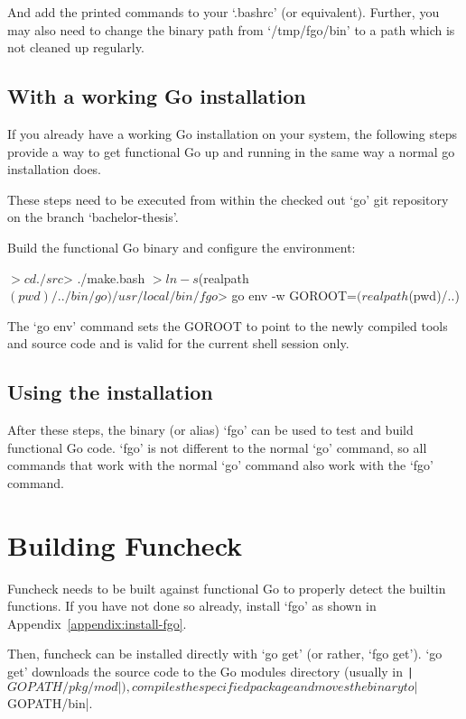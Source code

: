 And add the printed commands to your `.bashrc' (or equivalent). Further, you may
also need to change the binary path from `/tmp/fgo/bin' to a path which is not
cleaned up regularly.

\subsection{With a working Go installation}

If you already have a working Go installation on your system, the following
steps provide a way to get functional Go up and running in the same way
a normal go installation does.

These steps need to be executed from within the checked out `go' git
repository on the branch `bachelor-thesis'.

Build the functional Go binary and configure the environment:
\begin{bashcode}
$> cd ./src
$> ./make.bash
$> ln -s $(realpath $(pwd)/../bin/go) /usr/local/bin/fgo
$> go env -w GOROOT=$(realpath $(pwd)/..)
\end{bashcode}

The `go env' command sets the GOROOT to point to the newly compiled tools
and source code and is valid for the current shell session only.

\subsection{Using the installation}

After these steps, the binary (or alias) `fgo' can be used to test and build
functional Go code. `fgo' is not different to the normal `go' command, so
all commands that work with the normal `go' command also work with
the `fgo' command.



\section{Building Funcheck}\label{appendix:build-funcheck}

Funcheck needs to be built against functional Go to properly detect the builtin functions.
If you have not done so already, install `fgo' as shown in Appendix~\ref{appendix:install-fgo}.

Then, funcheck can be installed directly with `go get' (or rather, `fgo get'). `go get'
downloads the source code to the Go modules directory (usually in \texttt|$GOPATH/pkg/mod|),
compiles the specified package and moves the binary to \texttt|$GOPATH/bin|.

